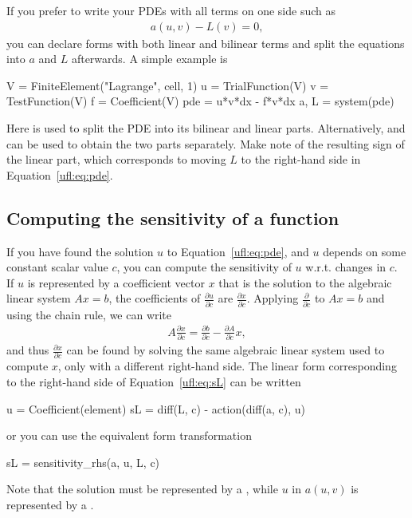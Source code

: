 If you prefer to write your PDEs with all terms on one side such as
\begin{align}\label{ufl:eq:pde}
a(u, v) - L(v) = 0,
\end{align}
you can declare forms with both linear and bilinear terms and split the
equations into $a$ and $L$ afterwards.  A simple example is
\begin{uflcode}
V = FiniteElement("Lagrange", cell, 1)
u = TrialFunction(V)
v = TestFunction(V)
f = Coefficient(V)
pde = u*v*dx - f*v*dx
a, L = system(pde)
\end{uflcode}
Here  is used to split the PDE into its bilinear and
linear parts. Alternatively,  and  can be used to
obtain the two parts separately. Make note of the resulting sign of the
linear part, which corresponds to moving $L$ to the right-hand side in
Equation~\eqref{ufl:eq:pde}.

\subsection{Computing the sensitivity of a function} \label{ufl:sec:sensitivity}

If you have found the solution $u$ to Equation~\eqref{ufl:eq:pde},
and $u$ depends on some constant scalar value $c$, you can compute the
sensitivity of $u$ w.r.t. changes in $c$.  If $u$ is represented by
a coefficient vector $x$ that is the solution to the algebraic linear
system $A x = b$, the coefficients of $\frac{\partial u}{\partial c}$
are $\frac{\partial x}{\partial c}$.  Applying $\frac{\partial}{\partial
c}$ to $A x = b$ and using the chain rule, we can write
\begin{align}\label{ufl:eq:sL}
A \frac{\partial x}{\partial c} = \frac{\partial b}{\partial c} - \frac{\partial A}{\partial c} x,
\end{align}
and thus $\frac{\partial x}{\partial c}$ can be found by solving the
same algebraic linear system used to compute $x$, only with a different
right-hand side.  The linear form corresponding to the right-hand side
of Equation~\eqref{ufl:eq:sL} can be written
\begin{uflcode}
u = Coefficient(element)
sL = diff(L, c) - action(diff(a, c), u)
\end{uflcode}
or you can use the equivalent form transformation
\begin{uflcode}
sL = sensitivity_rhs(a, u, L, c)
\end{uflcode}
Note that the solution  must be represented by a ,
while $u$ in $a(u, v)$ is represented by a .


